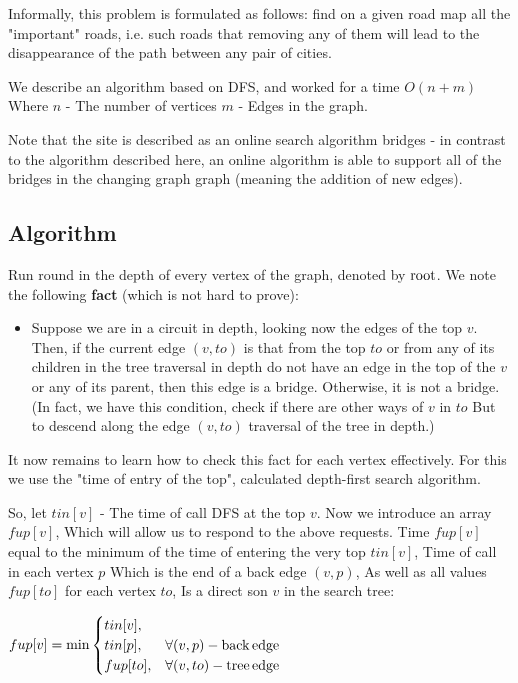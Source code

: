Informally, this problem is formulated as follows: find on a given road map all the "important" roads, i.e. such roads that removing any of them will lead to the disappearance of the path between any pair of cities.

We describe an algorithm based on DFS, and worked for a time $O (n + m)$ Where $n$ - The number of vertices $m$ - Edges in the graph.

Note that the site is described as an online search algorithm bridges - in contrast to the algorithm described here, an online algorithm is able to support all of the bridges in the changing graph graph (meaning the addition of new edges).

\subsection{ Algorithm }

Run round in the depth of every vertex of the graph, denoted by $\rm root$. We note the following \textbf{fact} (which is not hard to prove):

\begin{itemize} \item Suppose we are in a circuit in depth, looking now the edges of the top $v$. Then, if the current edge $(v, to)$ is that from the top $to$ or from any of its children in the tree traversal in depth do not have an edge in the top of the $v$ or any of its parent, then this edge is a bridge. Otherwise, it is not a bridge. (In fact, we have this condition, check if there are other ways of $v$ in $to$ But to descend along the edge $(v, to)$ traversal of the tree in depth.) \end{itemize}

It now remains to learn how to check this fact for each vertex effectively. For this we use the "time of entry of the top", calculated depth-first search algorithm.

So, let $tin [v]$ - The time of call DFS at the top $v$. Now we introduce an array $fup [v]$, Which will allow us to respond to the above requests. Time $fup [v]$ equal to the minimum of the time of entering the very top $tin [v]$, Time of call in each vertex $p$ Which is the end of a back edge $(v, p)$, As well as all values $fup [to]$ for each vertex $to$, Is a direct son $v$ in the search tree:

$fup[v]=\min\begin{cases}
tin[v],\\
tin[p], & \forall(v,p)-{\rm back\, edge}\\
fup[to], & \forall(v,to)-{\rm tree\, edge}
\end{cases}$

